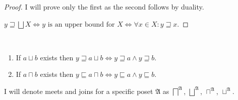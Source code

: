 \begin{proof}
I will prove only the first as the second follows by duality.

$y\sqsupseteq\bigsqcup X\Leftrightarrow y\text{ is an upper bound for }X\Leftrightarrow\forall x\in X:y\sqsupseteq x$.
\end{proof}
\begin{cor}
~
\begin{enumerate}
\item If $a\sqcup b$ exists then $y\sqsupseteq a\sqcup b\Leftrightarrow y\sqsupseteq a\land y\sqsupseteq b$.
\item If $a\sqcap b$ exists then $y\sqsubseteq a\sqcap b\Leftrightarrow y\sqsubseteq a\land y\sqsubseteq b$.
\end{enumerate}
\end{cor}
I will denote meets and joins for a specific poset $\mathfrak{A}$
as $\bigsqcap^{\mathfrak{A}}$, $\bigsqcup^{\mathfrak{A}}$, $\sqcap^{\mathfrak{A}}$,
$\sqcup^{\mathfrak{A}}$.


